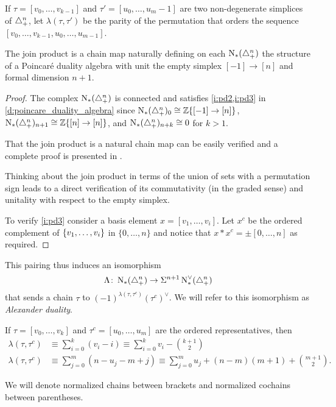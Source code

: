\begin{notation}
	If $\tau = [v_0,\dots,v_{k-1}]$ and $\tau'=[u_0,\dots,u_{m}-1]$ are two non-degenerate simplices of $\triangle_{+}^n$, let $\lambda(\tau,\tau')$ be the parity of the permutation that orders the sequence $[v_0,\dots,v_{k-1},u_0,\dots,u_{m-1}]$.
\end{notation}

\begin{theorem}
	The join product is a chain map naturally defining on each $\operatorname{N}_{*}(\triangle_{+}^{n})$ the structure of a Poincar\'e duality algebra with unit the empty simplex $[-1] \to [n]$ and formal dimension $n+1$.
\end{theorem}

\begin{proof}
	The complex $\operatorname{N}_{*}(\triangle_{+}^{n})$ is connected and satisfies \cref{i:pd2,i:pd3} in \cref{d:poincare_duality_algebra} since $\operatorname{N}_{*}(\triangle_{+}^{n})_0 \cong \mathbb{Z}\{[-1] \to [n]\}$, $\operatorname{N}_{*}(\triangle_{+}^{n})_{n+1} \cong \mathbb{Z}\{[n] \to [n]\}$, and $\operatorname{N}_{*}(\triangle_{+}^{n})_{n+k} \cong 0$ for $k>1$.

	That the join product is a natural chain map can be easily verified and a complete proof is presented in \cite[p.19]{medina2020prop1}.

	Thinking about the join product in terms of the union of sets with a permutation sign leads to a direct verification of its commutativity (in the graded sense) and unitality with respect to the empty simplex.

	To verify \cref{i:pd3} consider a basis element $x = [v_1,\dots,v_i]$.
	Let $x^c$ be the ordered complement of $\{v_1,\dots,v_i\}$ in $\{0,\dots,n\}$ and notice that $x \ast x^c = \pm [0,\dots,n]$ as required.
\end{proof}

This pairing thus induces an isomorphism
\begin{equation}\label{eq:iso1}
	\Lambda \colon \operatorname{N}_{*}(\triangle_{+}^n) \to \Sigma^{n+1}\operatorname{N}^\vee_{*}(\triangle_{+}^n)
\end{equation}
that sends a chain $\tau$ to $(-1)^{\lambda(\tau,\tau^c)}(\tau^c)^\vee$. We will refer to this isomorphism as \emph{Alexander duality}.

\begin{remark}\label{remark:alex}
	If $\tau = [v_0,\dots,v_k]$ and $\tau^c = [u_0,\dots,u_m]$ are the ordered representatives, then
	\begin{align*}
		\lambda(\tau,\tau^c)&\equiv \sum_{i=0}^k (v_i-i) \equiv \sum_{i=0}^k v_i - \binom{k+1}{2} \\
		\lambda(\tau,\tau^c)&\equiv \sum_{j=0}^m (n-u_j-m+j) \equiv \sum_{j=0}^m u_j +(n-m)(m+1)+\binom{m+1}{2}.
	\end{align*}
\end{remark}

\begin{notation}
	We will denote normalized chains between brackets and normalized cochains between parentheses.
\end{notation}